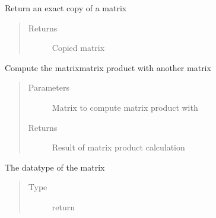 \documentclass[letterpaper,10pt,english]{sphinxmanual}
\begin{document}
\begin{fulllineitems}
\begin{fulllineitems}
\begin{quote}
\begin{description}
\end{description}\end{quote}

\end{fulllineitems}


\begin{fulllineitems}
\label{\detokenize{libpymath.matrix:libpymath.matrix.matrix.Matrix.copy}}
Return an exact copy of a matrix
\begin{quote}\begin{description}
\item[{Returns}] \leavevmode
Copied matrix

\end{description}\end{quote}

\end{fulllineitems}


\begin{fulllineitems}
\label{\detokenize{libpymath.matrix:libpymath.matrix.matrix.Matrix.dot}}
Compute the matrix\sphinxhyphen{}matrix product with another matrix
\begin{quote}\begin{description}
\item[{Parameters}] \leavevmode
{} \textendash{} Matrix to compute matrix product with

\item[{Returns}] \leavevmode
Result of matrix product calculation

\end{description}\end{quote}

\end{fulllineitems}


\begin{fulllineitems}
\label{\detokenize{libpymath.matrix:libpymath.matrix.matrix.Matrix.dtype}}
The datatype of the matrix
\begin{quote}\begin{description}
\item[{Type}] \leavevmode
return


\end{description}
\end{quote}
\end{fulllineitems}
\end{fulllineitems}
\end{document}
